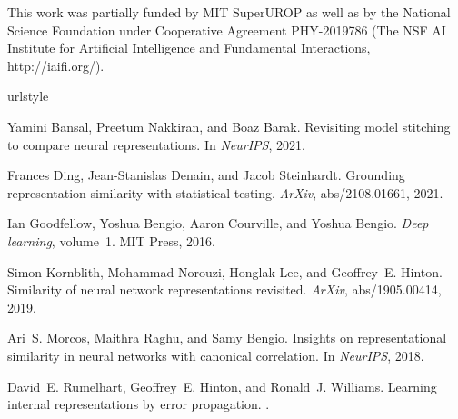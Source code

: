\documentclass{article}
\begin{document}
\begin{ack}
This work was partially funded by MIT SuperUROP as well as by the National Science Foundation under Cooperative Agreement PHY-2019786 (The NSF AI Institute for Artificial Intelligence and Fundamental Interactions, http://iaifi.org/).
\end{ack}

\small
\begin{thebibliography}{6}
  \providecommand{\natexlab}[1]{#1}
  \providecommand{\url}[1]{\texttt{#1}}
  \expandafter\ifx\csname urlstyle\endcsname\relax
    \providecommand{\doi}[1]{doi: #1}\else
    \providecommand{\doi}{doi: \begingroup \urlstyle{rm}\Url}\fi
  
  Yamini Bansal, Preetum Nakkiran, and Boaz Barak.
  \newblock Revisiting model stitching to compare neural representations.
  \newblock In \emph{NeurIPS}, 2021.
  
  Frances Ding, Jean-Stanislas Denain, and Jacob Steinhardt.
  \newblock Grounding representation similarity with statistical testing.
  \newblock \emph{ArXiv}, abs/2108.01661, 2021.
  
  Ian Goodfellow, Yoshua Bengio, Aaron Courville, and Yoshua Bengio.
  \newblock \emph{Deep learning}, volume~1.
  \newblock MIT Press, 2016.
  
  Simon Kornblith, Mohammad Norouzi, Honglak Lee, and Geoffrey~E. Hinton.
  \newblock Similarity of neural network representations revisited.
  \newblock \emph{ArXiv}, abs/1905.00414, 2019.
  
  Ari~S. Morcos, Maithra Raghu, and Samy Bengio.
  \newblock Insights on representational similarity in neural networks with
    canonical correlation.
  \newblock In \emph{NeurIPS}, 2018.
  
  David~E. Rumelhart, Geoffrey~E. Hinton, and Ronald~J. Williams.
  \newblock Learning internal representations by error propagation.
  .


\end{thebibliography}
\end{document}
